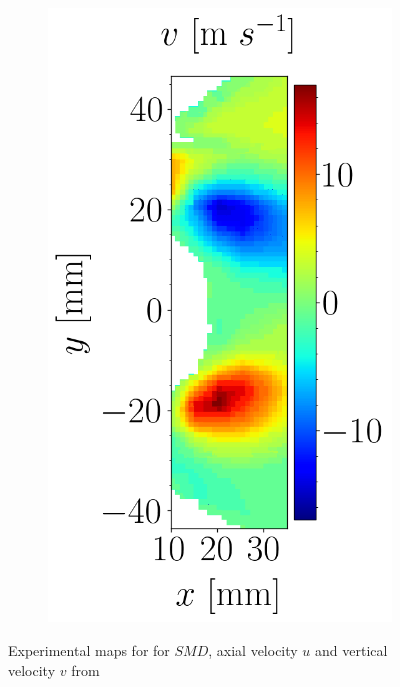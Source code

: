 \begin{figure}[h!]
\begin{subfigure}[b]{0.3\textwidth}
	\centering
   \includegraphics[scale=0.4]{./part3_applications/figures_ch9_lagrangian/expe_maps/u_vertical_map.png}
\end{subfigure}
\caption{Experimental maps for for $SMD$, axial velocity $u$ and vertical velocity $v$ from }
\label{fig:maps_BIMER_renaud_expe_results}
\end{figure}

